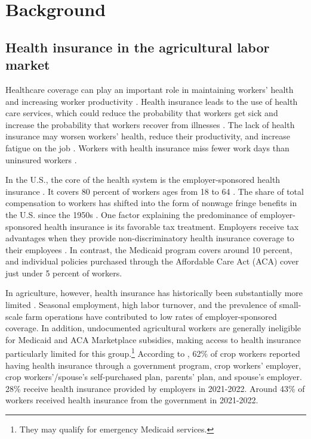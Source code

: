 \documentclass[12pt]{article}
\begin{document}
\section{Background}
\subsection{Health insurance in the agricultural labor market}
Healthcare coverage can play an important role in maintaining workers' health and increasing worker productivity \citep{rutledge_health_2026}. Health insurance leads to the use of health care services, which could reduce the probability that workers get sick and increase the probability that workers recover from illnesses \citep{dizioli_health_2016}. The lack of health insurance may worsen workers' health, reduce their productivity, and increase fatigue on the job \citep[see, e.g.,][]{dizioli_health_2016}. Workers with health insurance miss fewer work days than uninsured workers \citep{dizioli_health_2016}. 


In the U.S., the core of the health system is the employer-sponsored health insurance \citep{dizioli_health_2016}. It covers 80 percent of workers ages from 18 to 64 \citep{curchin_complicated_2025}. The share of total compensation to workers has shifted into the form of nonwage fringe benefits in the U.S. since the 1950s \citep{jensen_role_1985}. One factor explaining the predominance of employer-sponsored health insurance is its favorable tax treatment. Employers receive tax advantages when they provide non-discriminatory health insurance coverage to their employees \citep{dizioli_health_2016}. In contrast, the Medicaid program covers around 10 percent, and individual policies purchased through the Affordable Care Act (ACA) cover just under 5 percent of workers.


In agriculture, however, health insurance has historically been substantially more limited \citep{luo_health_2018, rutledge_health_2026}. Seasonal employment, high labor turnover, and the prevalence of small-scale farm operations have contributed to low rates of employer-sponsored coverage. In addition, undocumented agricultural workers are generally ineligible for Medicaid and ACA Marketplace subsidies, making access to health insurance particularly limited for this group.\footnote{They may qualify for emergency Medicaid services.} According to \citep{jbs_international_findings_2023}, 62\% of crop workers reported having health insurance through a government program, crop workers' employer, crop workers'/spouse's self-purchased plan, parents' plan, and spouse's employer. 28\% receive health insurance provided by employers in 2021-2022. Around 43\% of workers received health insurance from the government in 2021-2022.
\end{document}
